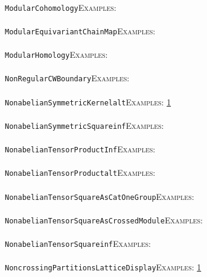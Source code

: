 \documentclass[a4paper,11pt]{report}
\begin{document}
{{ \\
 \texttt{ModularCohomology}{\nobreakspace}{\nobreakspace}{\nobreakspace}{\nobreakspace}\textsc{Examples:} \\
 \\
 \texttt{ModularEquivariantChainMap}{\nobreakspace}{\nobreakspace}{\nobreakspace}{\nobreakspace}\textsc{Examples:} \\
 \\
 \texttt{ModularHomology}{\nobreakspace}{\nobreakspace}{\nobreakspace}{\nobreakspace}\textsc{Examples:} \\
 \\
 \texttt{NonRegularCWBoundary}{\nobreakspace}{\nobreakspace}{\nobreakspace}{\nobreakspace}\textsc{Examples:} \\
 \\
 \texttt{NonabelianSymmetricKernel{\textunderscore}alt}{\nobreakspace}{\nobreakspace}{\nobreakspace}{\nobreakspace}\textsc{Examples:} \href{../www/SideLinks/About/aboutIntro.html} {1}{\nobreakspace} \\
 \\
 \texttt{NonabelianSymmetricSquare{\textunderscore}inf}{\nobreakspace}{\nobreakspace}{\nobreakspace}{\nobreakspace}\textsc{Examples:} \\
 \\
 \texttt{NonabelianTensorProduct{\textunderscore}Inf}{\nobreakspace}{\nobreakspace}{\nobreakspace}{\nobreakspace}\textsc{Examples:} \\
 \\
 \texttt{NonabelianTensorProduct{\textunderscore}alt}{\nobreakspace}{\nobreakspace}{\nobreakspace}{\nobreakspace}\textsc{Examples:} \\
 \\
 \texttt{NonabelianTensorSquareAsCatOneGroup}{\nobreakspace}{\nobreakspace}{\nobreakspace}{\nobreakspace}\textsc{Examples:} \\
 \\
 \texttt{NonabelianTensorSquareAsCrossedModule}{\nobreakspace}{\nobreakspace}{\nobreakspace}{\nobreakspace}\textsc{Examples:} \\
 \\
 \texttt{NonabelianTensorSquare{\textunderscore}inf}{\nobreakspace}{\nobreakspace}{\nobreakspace}{\nobreakspace}\textsc{Examples:} \\
 \\
 \texttt{NoncrossingPartitionsLatticeDisplay}{\nobreakspace}{\nobreakspace}{\nobreakspace}{\nobreakspace}\textsc{Examples:} \href{../www/SideLinks/About/aboutNoncrossing.html} {1}{\nobreakspace} \\
}}
\end{document}
